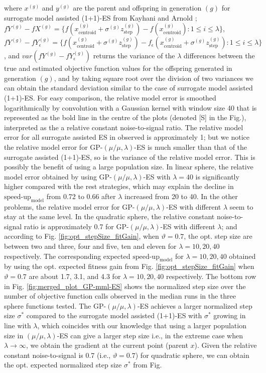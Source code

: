 where $x^{(g)}$ and $y^{(g)}$ are the parent and offspring in generation $(g)$ for surrogate model assisted (1+1)-ES from Kayhani and Arnold \cite{DBLP:conf/ppsn/KayhaniA18}; $fY^{(g)}- fX^{(g)}= \{ f(x_{\text{centroid}}^{(g)} + \sigma^{(g)} z_{\text{step}}^{(g)}) - f(x_{\text{centroid}}^{(g)}): 1 \leq i \leq \lambda \}$, $fY^{(g)}- fY_{\epsilon}^{(g)} = \{ f(x_{\text{centroid}}^{(g)} + \sigma^{(g)} z_{\text{step}}^{(g)}) - f_\epsilon (x_{\text{centroid}}^{(g)} + \sigma^{(g)} z_{\text{step}}^{(g)}) : 1 \leq i \leq \lambda \}$, and $var(fY^{(g)}- fY_{\epsilon}^{(g)})$ returns the variance of the $\lambda$ differences between the true and estimated objective function values for the offspring generated in generation $(g)$, and by taking square root over the division of two variances we can obtain the standard deviation similar to the case of surrogate model assisted (1+1)-ES. For easy comparison, the relative model error is smoothed logarithmically by convolution with a Gaussian kernel with window size 40 that is represented as the bold line in the centre of the plots (denoted [S] in the Fig.), interpreted as the a relative constant noise-to-signal ratio. The relative model error for all surrogate assisted ES in observed is approximately 1; but we notice the relative model error for GP-$(\mu/\mu,\lambda)$-ES is much smaller than that of the surrogate assisted (1+1)-ES, so is the variance of the relative model error. This is possibly the benefit of using a large population size. In linear sphere, the relative model error obtained by using GP-$(\mu/\mu,\lambda)$-ES with $\lambda=40$ is significantly higher compared with the rest strategies, which may explain the decline in $\text{speed-up}_{\text{model}}$ from 0.72 to 0.66 after $\lambda$ increased from 20 to 40. In the other problems, the relative model error for GP-$(\mu/\mu,\lambda)$-ES with different $\lambda$ seem to stay at the same level. In the quadratic sphere, the relative constant noise-to-signal ratio is approximately 0.7 for GP-$(\mu/\mu,\lambda)$-ES with different $\lambda$; and according to Fig. \ref{fig:opt_stepSize_fitGain}, when $\vartheta=0.7$, the opt. step size are between two and three, four and five, ten and eleven for $\lambda=10,20,40$ respectively. The corresponding expected $\text{speed-up}_{\text{model}}$ for $\lambda=10,20,40$ obtained by using the opt. expected fitness gain from Fig. \ref{fig:opt_stepSize_fitGain} when $\vartheta=0.7$ are about 1.7, 3.1, and 4.3 for $\lambda=10,20,40$ respectively. The bottom row in Fig. \ref{fig:merged_plot_GP-mml-ES} shows the normalized step size over the number of objective function calls observed in the median runs in the three sphere functions tested. The GP-$(\mu/\mu,\lambda)$-ES achieves a larger normalized step size $\sigma^*$ compared to the surrogate model assisted (1+1)-ES with $\sigma^*$ growing in line with $\lambda$, which coincides with our knowledge that using a larger population size in $(\mu/\mu,\lambda)$-ES can give a larger step size i.e., in the extreme case when $\lambda \rightarrow \infty $, we obtain the gradient at the current point (parent $x$). Given the relative constant noise-to-signal is 0.7 (i.e., $\vartheta=0.7$) for quadratic sphere, we can obtain the opt. expected normalized step size $\sigma^*$ from Fig. 